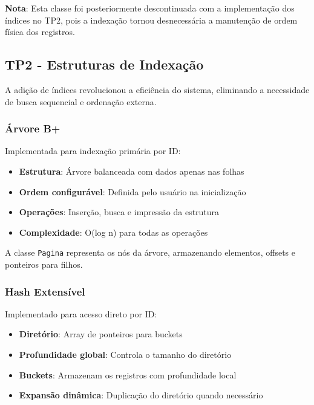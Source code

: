 \documentclass[12pt,a4paper]{article}
\let\oldsubsection\subsection
\renewcommand{\subsection}[1]{\needspace{3\baselineskip}\oldsubsection{#1}}
\begin{document}
\textbf{Nota}: Esta classe foi posteriormente descontinuada com a implementação dos índices no TP2, pois a indexação tornou desnecessária a manutenção de ordem física dos registros.

\subsection{TP2 - Estruturas de Indexação}

A adição de índices revolucionou a eficiência do sistema, eliminando a necessidade de busca sequencial e ordenação externa.

\subsubsection{Árvore B+}

Implementada para indexação primária por ID:

\begin{itemize}
    \item \textbf{Estrutura}: Árvore balanceada com dados apenas nas folhas
    \item \textbf{Ordem configurável}: Definida pelo usuário na inicialização
    \item \textbf{Operações}: Inserção, busca e impressão da estrutura
    \item \textbf{Complexidade}: O(log n) para todas as operações
\end{itemize}

A classe \texttt{Pagina} representa os nós da árvore, armazenando elementos, offsets e ponteiros para filhos.

\subsubsection{Hash Extensível}

Implementado para acesso direto por ID:

\begin{itemize}
    \item \textbf{Diretório}: Array de ponteiros para buckets
    \item \textbf{Profundidade global}: Controla o tamanho do diretório
    \item \textbf{Buckets}: Armazenam os registros com profundidade local
    \item \textbf{Expansão dinâmica}: Duplicação do diretório quando necessário
\end{itemize}
\end{document}
